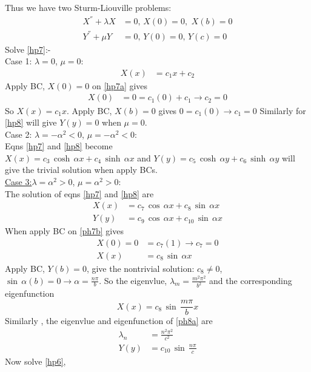 Thus we have two Sturm-Liouville problems:
\begin{align}
X^{''}+\lambda X&=0,\,X(0)=0,\,\,X(b)=0\label{hp7}\\
Y^{''}+\mu Y&=0,\,Y(0)=0,\,Y(c)=0\label{hp8}
\end{align}
Solve \eqref{hp7}:-\\
Case 1: $\lambda=0$, $\mu=0$:\\
\begin{align}
X(x)&=c_1x+c_2\label{hp7a}
\end{align}
Apply BC, $X(0)=0$ on \eqref{hp7a} gives
\begin{align*}
X(0)&=0=c_1(0)+c_1\rightarrow c_2=0
\end{align*}
So $X(x)=c_1x$. Apply BC, $X(b)=0$ gives $0=c_1(0)\to c_1=0$
Similarly for \eqref{hp8} will give $Y(y)=0$ when $\mu=0$.\\
Case 2: $\lambda=-\alpha^2<0$, $\mu=-\alpha^2<0$:\\
Eqns \eqref{hp7} and \eqref{hp8} become\\
$X(x)=c_3\,\cosh\,\alpha x+c_4\,\sinh\,\alpha x$ and $Y(y)=c_5\,\cosh\,\alpha y+c_6\,\sinh\,\alpha y$ will give the trivial solution when apply BCs.\\
\underline{Case 3:}$\lambda=\alpha^2>0$, $\mu=\alpha^2>0$:\\
The solution of eqns \eqref{hp7} and \eqref{hp8} are
\begin{align}
X(x)&=c_7\,\cos\,\alpha x+c_8\,\sin\,\alpha x\label{ph7b}\\
Y(y)&=c_9\,\cos\,\alpha x+c_{10}\,\sin\,\alpha x\label{ph8a}
\end{align}
When apply BC on \eqref{ph7b} gives 
\begin{align*}
X(0)=0&=c_7(1)\to c_7=0\\
X(x)&=c_8\,\sin\,\alpha x
\end{align*}
Apply BC, $Y(b)=0$, give the nontrivial solution: $c_8\neq 0$, $\sin\,\alpha (b)=0\to \alpha=\frac{n\pi}{b}$. So the eigenvlue, $\lambda_m=\frac{m^2\pi^2}{b^2}$ and the corresponding eigenfunction 
\begin{equation}
X(x)=c_8\,\sin\,\frac{m\pi}{b}x
\end{equation}
Similarly , the eigenvlue and eigenfunction of \eqref{ph8a} are
\begin{align}
\lambda_n&=\frac{n^2\pi^2}{c^2}\label{hp8b}\\
Y(y)&=c_{10}\,\sin\,\frac{n\pi}{c}\label{ph8c}
\end{align}
Now solve \eqref{hp6},

